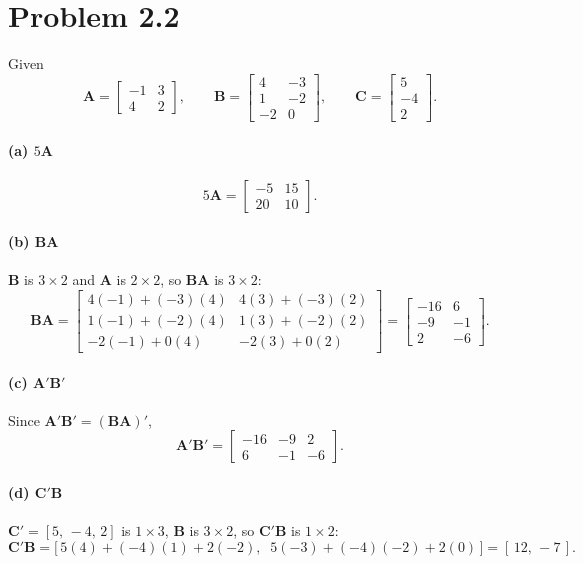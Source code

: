 \documentclass[11pt]{article}
\newcommand{\bA}{\mathbf{A}}
\newcommand{\bB}{\mathbf{B}}
\newcommand{\bC}{\mathbf{C}}
\begin{document}
\section*{Problem 2.2}

Given
\[
\bA = \begin{bmatrix} -1 & 3 \\ 4 & 2 \end{bmatrix}, \qquad
\bB = \begin{bmatrix} 4 & -3 \\ 1 & -2 \\ -2 & 0 \end{bmatrix}, \qquad
\bC = \begin{bmatrix} 5 \\ -4 \\ 2 \end{bmatrix}.
\]

\paragraph{(a) $5\bA$}
\[
5\bA = \begin{bmatrix} -5 & 15 \\ 20 & 10 \end{bmatrix}.
\]

\paragraph{(b) $\bB\bA$}
$\bB$ is $3\times 2$ and $\bA$ is $2\times 2$, so $\bB\bA$ is $3\times 2$:
\[
\bB\bA =
\begin{bmatrix}
4(-1)+(-3)(4) & 4(3)+(-3)(2) \\
1(-1)+(-2)(4) & 1(3)+(-2)(2) \\
-2(-1)+0(4) & -2(3)+0(2)
\end{bmatrix}
=
\begin{bmatrix}
-16 & 6 \\
-9 & -1 \\
2 & -6
\end{bmatrix}.
\]

\paragraph{(c) $\bA'\bB'$}
Since $\bA'\bB' = (\bB\bA)'$,
\[
\bA'\bB' = \begin{bmatrix} -16 & -9 & 2 \\ 6 & -1 & -6 \end{bmatrix}.
\]

\paragraph{(d) $\bC'\bB$}
$\bC' = [5,\,-4,\,2]$ is $1\times 3$, $\bB$ is $3\times2$, so $\bC'\bB$ is $1\times 2$:
\[
\bC'\bB = \big[\,5(4)+(-4)(1)+2(-2),\;\; 5(-3)+(-4)(-2)+2(0)\,\big] = [\,12,\, -7\,].
\]
\end{document}
